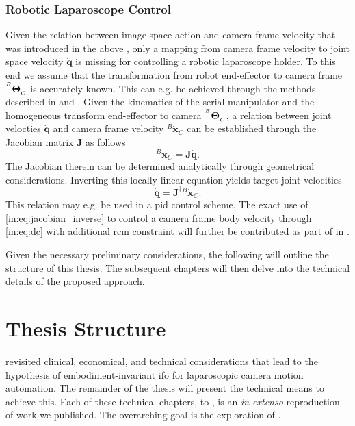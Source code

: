 
\subsubsection{Robotic Laparoscope Control}
\label{in:sec:robotic_laparoscope_control}
Given the relation between image space action and camera frame velocity that was introduced in the above , only a mapping from camera frame velocity to joint space velocity $\dot{\mathbf{q}}$ is missing for controlling a robotic laparoscope holder. To this end we assume that the transformation from robot end-effector to camera frame ${}^{^E}\mathbf{\Theta}_{_C}$ is accurately known. This can e.g. be achieved through the methods described in  and . Given the kinematics of the serial manipulator and the homogeneous transform end-effector to camera ${}^{^E}\mathbf{\Theta}_{_C}$, a relation between joint velocties $\dot{\mathbf{q}}$ and camera frame velocity ${}^B\dot{\mathbf{x}}_C$ can be established through the Jacobian matrix $\mathbf{J}$ as follows
\begin{equation}
    {}^B\dot{\mathbf{x}}_C = \mathbf{J} \dot{\mathbf{q}}.
\end{equation}
The Jacobian therein can be determined analytically through geometrical considerations. Inverting this locally linear equation yields target joint velocities
\begin{equation}
    \dot{\mathbf{q}} = \mathbf{J}^{\dagger}{}^B\dot{\mathbf{x}}_C.
    \label{in:eq:jacobian_inverse}
\end{equation}
This relation may e.g. be used in a \gls{pid} control scheme. The exact use of \eqref{in:eq:jacobian_inverse} to control a camera frame body velocity through \eqref{in:eq:dc} with additional \gls{rcm} constraint will further be contributed as part of  in .

Given the necessary preliminary considerations, the following  will outline the structure of this thesis. The subsequent chapters will then delve into the technical details of the proposed approach.

\section{Thesis Structure}
\label{in:sec:thesis_structure}
\textbf{} revisited clinical, economical, and technical considerations that lead to the hypothesis of embodiment-invariant \gls{ifo} for laparoscopic camera motion automation. The remainder of the thesis will present the technical means to achieve this. Each of these technical chapters,  to , is an \textit{in extenso} reproduction of work we published. The overarching goal is the exploration of . 

